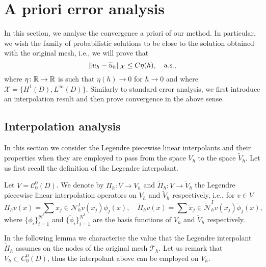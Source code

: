 \section{A priori error analysis}

In this section, we analyse the convergence a priori of our method. In particular, we wish the family of probabilistic solutions to be close to the solution obtained with the original mesh, i.e., we will prove that 
\begin{equation}\label{eq:DefProbConv}
	\lVert u_h - \widetilde u_h\rVert_{\mathcal X} \leq C\eta(h), \quad \text{a.s.},
\end{equation}
where $\eta \colon \mathbb{R} \to \mathbb{R}$ is such that $\eta(h) \to 0$ for $h \to 0$ and where $\mathcal X = \{H^1(D), L^\infty(D)\}$. Similarly to standard error analysis, we first introduce an interpolation result and then prove convergence in the above sense.

\subsection{Interpolation analysis}

In this section we consider the Legendre piecewise linear interpolants and their properties when they are employed to pass from the space $V_h$ to the space $\widetilde V_h$. Let us first recall the definition of the Legendre interpolant.

\begin{definition}\label{def:Legendre} Let $V = \mathcal C^0_0(D)$. We denote by $\Pi_h\colon V \to V_h$ and $\widetilde \Pi_h\colon V \to \widetilde V_h$ the Legendre piecewise linear interpolation operators on $V_h$ and $\widetilde V_h$ respectively, i.e., for $v \in V$
	\begin{equation}
		\Pi_h v(x) = \sum{x_j \in \mathcal N_h^I} v(x_j) \phi_j(x), \quad	\widetilde \Pi_h v(x) = \sum{\tilde x_j \in \widetilde {\mathcal N}_h^I} v(x_j) \tilde \phi_j(x),
	\end{equation}
	where $\{\phi_i\}_{i=1}^{N^I}$ and $\{\tilde \phi_i\}_{i=1}^{N^I}$ are the basis functions of $V_h$ and $\widetilde V_h$ respectively.
\end{definition}

In the following lemma we characterise the value that the Legendre interpolant $\widetilde \Pi_h$ assumes on the nodes of the original mesh $\mathcal T_h$. Let us remark that $V_h \subset C_0^0(D)$, thus the interpolant above can be employed on $V_h$.

